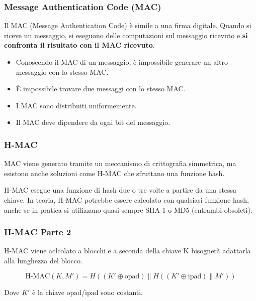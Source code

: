 \begin{frame}
	\frametitle{Message Authentication Code (MAC)}

	Il MAC (Message Authentication Code) è simile a una firma digitale.
	Quando si riceve un messaggio, si eseguono delle computazioni sul messaggio ricevuto e \textbf{si confronta il risultato con il MAC ricevuto}.

	\begin{itemize}
		\item Conoscendo il MAC di un messaggio, è impossibile generare un altro messaggio con lo stesso MAC.
		\item È impossibile trovare due messaggi con lo stesso MAC.
		\item I MAC sono distribuiti uniformemente.
		\item Il MAC deve dipendere da ogni bit del messaggio.
	\end{itemize}
\end{frame}

\begin{frame}
	\frametitle{H-MAC}

	MAC viene generato tramite un meccanismo di crittografia simmetrica, ma esistono anche soluzioni come H-MAC
	che sfruttano una funzione hash.

	\vspace{1cm}

	H-MAC esegue una funzione di hash due o tre volte a partire da una stessa chiave. In teoria, H-MAC potrebbe essere
	calcolato con qualsiasi funzione hash, anche se in pratica si utilizzano quasi sempre SHA-1 o MD5 (entrambi obsoleti).


\end{frame}

\begin{frame}
	\frametitle{H-MAC Parte 2}

	H-MAC viene aclcolato a blocchi e a seconda della chiave K bisognerà adattarla alla lunghezza del blocco.

	\[
		\text{H-MAC}(K, M') = H((K' \oplus \text{opad}) \| H((K' \oplus \text{ipad}) \| M'))
	\]

	Dove $K'$ è la chiave $\text{opad}$/$\text{ipad}$ sono costanti.

\end{frame}

